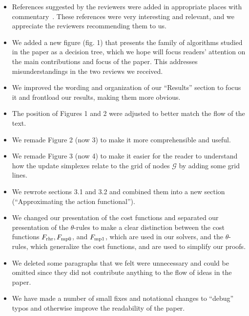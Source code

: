 \documentclass{article}
\begin{document}
\begin{itemize}

\item References suggested by the reviewers were added in appropriate
  places with
  commentary~\cite{treister2016fast,zhang2006high,bornemann2006finite,luo2012fast}. These
  references were very interesting and relevant, and we appreciate the
  reviewers recommending them to us.

\item We added a new figure (fig. 1) that presents the family of
  algorithms studied in the paper as a decision tree, which we hope
  will focus readers' attention on the main contributions and focus of
  the paper. This addresses misunderstandings in the two reviews we
  received.

\item We improved the wording and organization of our ``Results''
  section to focus it and frontload our results, making them more
  obvious.

\item The position of Figures 1 and 2 were adjusted to better match
  the flow of the text.

\item We remade Figure 2 (now 3) to make it more comprehensible and
  useful.

\item We remade Figure 3 (now 4) to make it easier for the reader to
  understand how the update simplexes relate to the grid of nodes
  $\mathcal{G}$ by adding some grid lines.

\item We rewrote sections 3.1 and 3.2 and combined them into a new
  section (``Approximating the action functional'').

\item We changed our presentation of the cost functions and separated
  our presentation of the $\theta$-rules to make a clear distinction
  between the cost functions $F_{\operatorname{rhr}}, F_{\operatorname{mp0}}$, and $F_{\operatorname{mp1}}$, which
  are used in our solvers, and the $\theta$-rules, which generalize
  the cost functions, and are used to simplify our proofs.

\item We deleted some paragraphs that we felt were unnecessary and
  could be omitted since they did not contribute anything to the flow
  of ideas in the paper.

\item We have made a number of small fixes and notational changes to
  ``debug'' typos and otherwise improve the readability of the paper.


\end{itemize}
\end{document}
